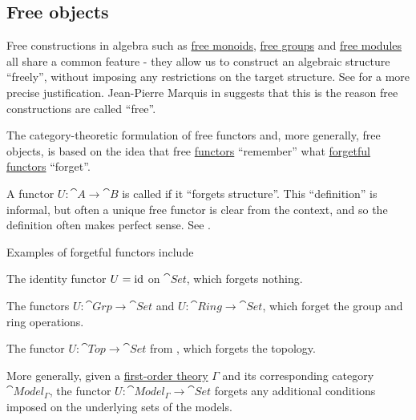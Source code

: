 \subsection{Free objects}\label{subsec:free_objects}

\begin{remark}\label{rem:free_construction_etymology}
  Free constructions in algebra such as \hyperref[def:free_monoid]{free monoids}, \hyperref[def:free_group]{free groups} and \hyperref[def:free_left_module]{free modules} all share a common feature - they allow us to construct an algebraic structure \enquote{freely}, without imposing any restrictions on the target structure. See  for a more precise justification. Jean-Pierre Marquis in \cite{StanfordPlato:category_theory} suggests that this is the reason free constructions are called \enquote{free}.

  The category-theoretic formulation of free functors and, more generally, free objects, is based on the idea that free \hyperref[def:free_functor]{functors} \enquote{remember} what \hyperref[def:forgetful_functor]{forgetful functors} \enquote{forget}.
\end{remark}

\begin{definition}\label{def:forgetful_functor}
  A functor \( U: \cat{A} \to \cat{B} \) is called  if it \enquote{forgets structure}. This \enquote{definition} is informal, but often a unique free functor is clear from the context, and so the definition often makes perfect sense. See .
\end{definition}

\begin{example}\label{ex:forgetful_functors}
  Examples of forgetful functors include

  \begin{thmenum}
    \item The identity functor \( U = \operatorname{id} \) on \( \cat{Set} \), which forgets nothing.
    \item The functors \( U: \cat{Grp} \to \cat{Set} \) and \( U: \cat{Ring} \to \cat{Set} \), which forget the group and ring operations.
    \item The functor \( U: \cat{Top} \to \cat{Set} \) from , which forgets the topology.
    \item More generally, given a \hyperref[def:first_order_theory]{first-order theory} \( \Gamma \) and its corresponding category \( \cat{Model}_\Gamma \), the functor \( U: \cat{Model}_\Gamma \to \cat{Set} \) forgets any additional conditions imposed on the underlying sets of the models.
  \end{thmenum}
\end{example}

